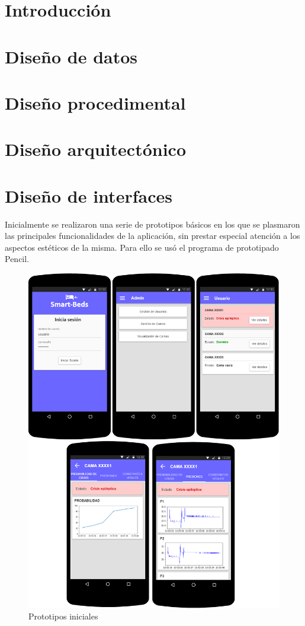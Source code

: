 
\section{Introducción}

\section{Diseño de datos}

\section{Diseño procedimental}

\section{Diseño arquitectónico}

\section{Diseño de interfaces}

Inicialmente se realizaron una serie de prototipos básicos en los que se plasmaron las principales funcionalidades de la aplicación, sin prestar especial atención a los aspectos estéticos de la misma. Para ello se usó el programa de prototipado Pencil. 

\begin{figure}
	\centering
	\includegraphics[width=1\textwidth]{../img/prototipos.png}
	\caption{Prototipos iniciales}
	\label{fig:prototipos}
\end{figure}
